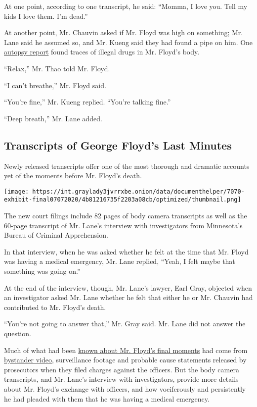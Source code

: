 At one point, according to one transcript, he said: ``Momma, I love you.
Tell my kids I love them. I'm dead.''

At another point, Mr. Chauvin asked if Mr. Floyd was high on something;
Mr. Lane said he assumed so, and Mr. Kueng said they had found a pipe on
him. One
\href{https://www.nytimes3xbfgragh.onion/article/george-floyd-autopsy-michael-baden.html}{autopsy
report} found traces of illegal drugs in Mr. Floyd's body.

``Relax,'' Mr. Thao told Mr. Floyd.

``I can't breathe,'' Mr. Floyd said.

``You're fine,'' Mr. Kueng replied. ``You're talking fine.''

``Deep breath,'' Mr. Lane added.

\hypertarget{transcripts-of-george-floyds-last-minutes}{%
\subsection{Transcripts of George Floyd's Last
Minutes}\label{transcripts-of-george-floyds-last-minutes}}

Newly released transcripts offer one of the most thorough and dramatic
accounts yet of the moments before Mr. Floyd's death.

\texttt{[image: https://int.graylady3jvrrxbe.onion/data/documenthelper/7070-exhibit-final07072020/4b81216735f2203a08cb/optimized/thumbnail.png]}

The new court filings include 82 pages of body camera transcripts as
well as the 60-page transcript of Mr. Lane's interview with
investigators from Minnesota's Bureau of Criminal Apprehension.

In that interview, when he was asked whether he felt at the time that
Mr. Floyd was having a medical emergency, Mr. Lane replied, ``Yeah, I
felt maybe that something was going on.''

At the end of the interview, though, Mr. Lane's lawyer, Earl Gray,
objected when an investigator asked Mr. Lane whether he felt that either
he or Mr. Chauvin had contributed to Mr. Floyd's death.

``You're not going to answer that,'' Mr. Gray said. Mr. Lane did not
answer the question.

Much of what had been
\href{https://www.nytimes3xbfgragh.onion/2020/05/31/us/george-floyd-investigation.html}{known
about Mr. Floyd's final moments} had come from
\href{https://www.nytimes3xbfgragh.onion/2020/05/26/us/george-floyd-minneapolis-police.html}{bystander
video}, surveillance footage and probable cause statements released by
prosecutors when they filed charges against the officers. But the body
camera transcripts, and Mr. Lane's interview with investigators, provide
more details about Mr. Floyd's exchange with officers, and how
vociferously and persistently he had pleaded with them that he was
having a medical emergency.

